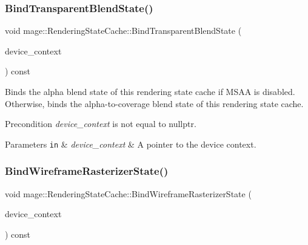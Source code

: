 \subsubsection{\texorpdfstring{Bind\+Transparent\+Blend\+State()}{BindTransparentBlendState()}}
{\footnotesize\ttfamily void mage\+::\+Rendering\+State\+Cache\+::\+Bind\+Transparent\+Blend\+State (\begin{DoxyParamCaption}\item[{I\+D3\+D11\+Device\+Context2 $\ast$}]{device\+\_\+context }\end{DoxyParamCaption}) const\hspace{0.3cm}{\ttfamily [noexcept]}}

Binds the alpha blend state of this rendering state cache if M\+S\+AA is disabled. Otherwise, binds the alpha-\/to-\/coverage blend state of this rendering state cache.

\begin{DoxyPrecond}{Precondition}
{\itshape device\+\_\+context} is not equal to {\ttfamily nullptr}. 
\end{DoxyPrecond}

\begin{DoxyParams}[1]{Parameters}
\mbox{\tt in}  & {\em device\+\_\+context} & A pointer to the device context. \\
\hline
\end{DoxyParams}
\hypertarget{structmage_1_1_rendering_state_cache_a5b962779cff508c3d022b9ad5df250f2}{}\label{structmage_1_1_rendering_state_cache_a5b962779cff508c3d022b9ad5df250f2} 
\subsubsection{\texorpdfstring{Bind\+Wireframe\+Rasterizer\+State()}{BindWireframeRasterizerState()}}
{\footnotesize\ttfamily void mage\+::\+Rendering\+State\+Cache\+::\+Bind\+Wireframe\+Rasterizer\+State (\begin{DoxyParamCaption}\item[{I\+D3\+D11\+Device\+Context2 $\ast$}]{device\+\_\+context }\end{DoxyParamCaption}) const\hspace{0.3cm}{\ttfamily [noexcept]}}

